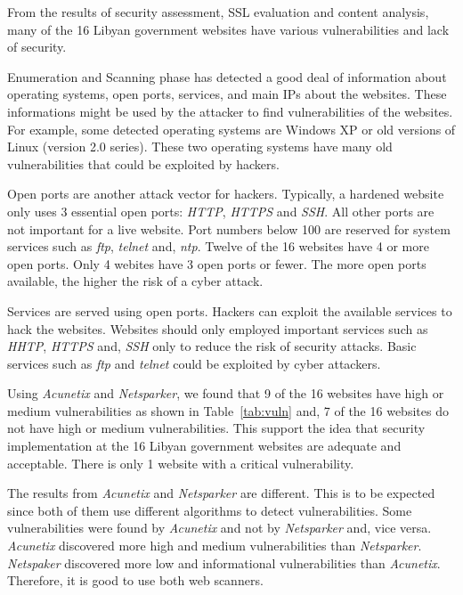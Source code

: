 \documentclass[conference]{IEEEtran}
\begin{document}
From the results of security assessment, SSL evaluation and content analysis, many of the 16 Libyan government websites have various vulnerabilities and lack of security.

Enumeration and Scanning phase has detected a good deal of information about operating systems, open
ports, services, and main IPs about the websites.
These informations might be used by the attacker to
find vulnerabilities of the websites. For example, some detected operating systems are Windows XP or old versions of Linux (version 2.0 series). These two operating systems have many old vulnerabilities that could be exploited by hackers.

Open ports are another attack vector for hackers. Typically, a hardened website only uses 3 essential open ports: \emph{HTTP}, \emph{HTTPS} and \emph{SSH}. All other ports are not important for a live website. Port numbers below 100 are reserved for system services such as \emph{ftp}, \emph{telnet} and, \emph{ntp}. Twelve of the 16 websites have 4 or more open ports. Only 4 webites have 3 open ports or fewer. The more open ports available, the higher the risk of a cyber attack.

Services are served using open ports. Hackers can exploit the available services to hack the websites. Websites should only employed important services such as \emph{HHTP}, \emph{HTTPS} and, \emph{SSH} only to reduce the risk of security attacks. Basic services such as \emph{ftp} and \emph{telnet} could be exploited by cyber attackers.

Using \emph{Acunetix} and \emph{Netsparker}, we found that 9 of the 16 websites have high or medium vulnerabilities as shown in Table~\ref{tab:vuln} and, 7 of the 16 websites do not have high or medium vulnerabilities. This support the idea that security implementation at the 16 Libyan government websites are adequate and acceptable. There is only 1 website with a critical vulnerability.

The results from \emph{Acunetix} and \emph{Netsparker} are different. This is to be expected since both of them use different algorithms to detect vulnerabilities. Some vulnerabilities were found by \emph{Acunetix} and not by \emph{Netsparker} and, vice versa. \emph{Acunetix} discovered more high and medium vulnerabilities than \emph{Netsparker}. \emph{Netspaker} discovered more low and informational vulnerabilities than \emph{Acunetix}. Therefore, it is good to use both web scanners.
\end{document}
